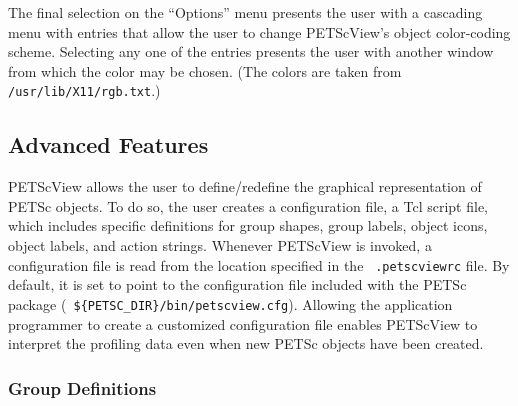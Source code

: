 {The final selection on the ``Options'' menu presents the user with a
cascading menu with entries that allow the user to change PETScView's
object color-coding scheme.  Selecting any one of the
entries presents the user with another window from which the color may
be chosen.  (The colors are taken from {\tt /usr/lib/X11/rgb.txt}.)

\subsection{Advanced Features}
\label{sec:petscview_advanced}

PETScView allows the user to define/redefine the graphical
representation of PETSc objects.  To do so, the user creates a
configuration file, a Tcl script file, which includes specific
definitions for group shapes, group labels, object icons, object
labels, and action strings.  Whenever PETScView is invoked, a
configuration file is read from the location specified in the {\tt
.petscviewrc} file.  By default, it is set to point to the
configuration file included with the PETSc package ({\tt
\$\{PETSC\_DIR\}/bin/petscview.cfg}).  Allowing the application programmer
to create a customized configuration file enables PETScView to
interpret the profiling data even when new PETSc objects have been
created.

\subsubsection{Group Definitions}

}
